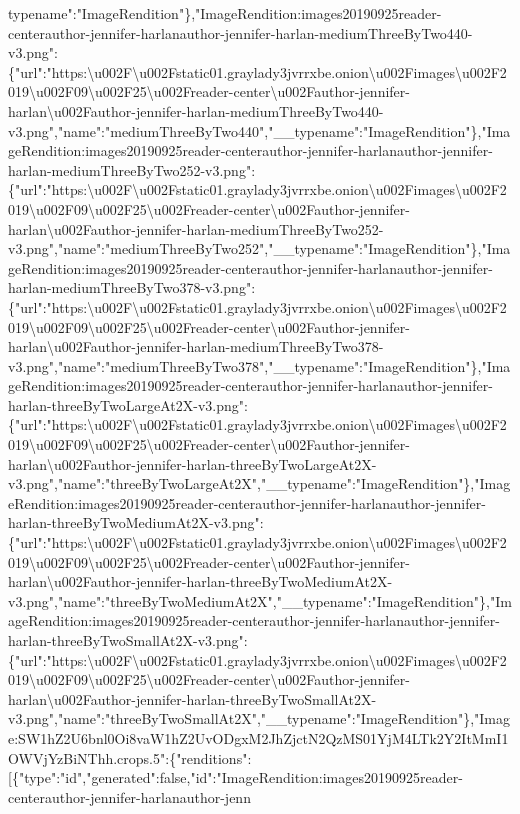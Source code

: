 typename":"ImageRendition"\},"ImageRendition:images20190925reader-centerauthor-jennifer-harlanauthor-jennifer-harlan-mediumThreeByTwo440-v3.png":\{"url":"https:\textbackslash{}u002F\textbackslash{}u002Fstatic01.graylady3jvrrxbe.onion\textbackslash{}u002Fimages\textbackslash{}u002F2019\textbackslash{}u002F09\textbackslash{}u002F25\textbackslash{}u002Freader-center\textbackslash{}u002Fauthor-jennifer-harlan\textbackslash{}u002Fauthor-jennifer-harlan-mediumThreeByTwo440-v3.png","name":"mediumThreeByTwo440","\_\_typename":"ImageRendition"\},"ImageRendition:images20190925reader-centerauthor-jennifer-harlanauthor-jennifer-harlan-mediumThreeByTwo252-v3.png":\{"url":"https:\textbackslash{}u002F\textbackslash{}u002Fstatic01.graylady3jvrrxbe.onion\textbackslash{}u002Fimages\textbackslash{}u002F2019\textbackslash{}u002F09\textbackslash{}u002F25\textbackslash{}u002Freader-center\textbackslash{}u002Fauthor-jennifer-harlan\textbackslash{}u002Fauthor-jennifer-harlan-mediumThreeByTwo252-v3.png","name":"mediumThreeByTwo252","\_\_typename":"ImageRendition"\},"ImageRendition:images20190925reader-centerauthor-jennifer-harlanauthor-jennifer-harlan-mediumThreeByTwo378-v3.png":\{"url":"https:\textbackslash{}u002F\textbackslash{}u002Fstatic01.graylady3jvrrxbe.onion\textbackslash{}u002Fimages\textbackslash{}u002F2019\textbackslash{}u002F09\textbackslash{}u002F25\textbackslash{}u002Freader-center\textbackslash{}u002Fauthor-jennifer-harlan\textbackslash{}u002Fauthor-jennifer-harlan-mediumThreeByTwo378-v3.png","name":"mediumThreeByTwo378","\_\_typename":"ImageRendition"\},"ImageRendition:images20190925reader-centerauthor-jennifer-harlanauthor-jennifer-harlan-threeByTwoLargeAt2X-v3.png":\{"url":"https:\textbackslash{}u002F\textbackslash{}u002Fstatic01.graylady3jvrrxbe.onion\textbackslash{}u002Fimages\textbackslash{}u002F2019\textbackslash{}u002F09\textbackslash{}u002F25\textbackslash{}u002Freader-center\textbackslash{}u002Fauthor-jennifer-harlan\textbackslash{}u002Fauthor-jennifer-harlan-threeByTwoLargeAt2X-v3.png","name":"threeByTwoLargeAt2X","\_\_typename":"ImageRendition"\},"ImageRendition:images20190925reader-centerauthor-jennifer-harlanauthor-jennifer-harlan-threeByTwoMediumAt2X-v3.png":\{"url":"https:\textbackslash{}u002F\textbackslash{}u002Fstatic01.graylady3jvrrxbe.onion\textbackslash{}u002Fimages\textbackslash{}u002F2019\textbackslash{}u002F09\textbackslash{}u002F25\textbackslash{}u002Freader-center\textbackslash{}u002Fauthor-jennifer-harlan\textbackslash{}u002Fauthor-jennifer-harlan-threeByTwoMediumAt2X-v3.png","name":"threeByTwoMediumAt2X","\_\_typename":"ImageRendition"\},"ImageRendition:images20190925reader-centerauthor-jennifer-harlanauthor-jennifer-harlan-threeByTwoSmallAt2X-v3.png":\{"url":"https:\textbackslash{}u002F\textbackslash{}u002Fstatic01.graylady3jvrrxbe.onion\textbackslash{}u002Fimages\textbackslash{}u002F2019\textbackslash{}u002F09\textbackslash{}u002F25\textbackslash{}u002Freader-center\textbackslash{}u002Fauthor-jennifer-harlan\textbackslash{}u002Fauthor-jennifer-harlan-threeByTwoSmallAt2X-v3.png","name":"threeByTwoSmallAt2X","\_\_typename":"ImageRendition"\},"Image:SW1hZ2U6bnl0Oi8vaW1hZ2UvODgxM2JhZjctN2QzMS01YjM4LTk2Y2ItMmI1OWVjYzBiNThh.crops.5":\{"renditions":{[}\{"type":"id","generated":false,"id":"ImageRendition:images20190925reader-centerauthor-jennifer-harlanauthor-jenn